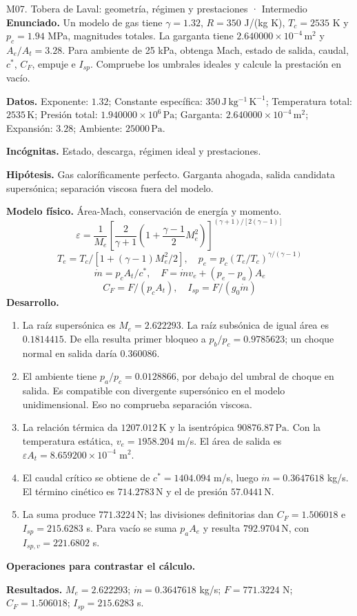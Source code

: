 \begin{studiumworked}{M07. Tobera de Laval: geometría, régimen y prestaciones · Intermedio}
\textbf{Enunciado.} Un modelo de gas tiene $\gamma=1.32$, $R=350$ J/(kg K), $T_c=2535$ K y $p_c=1.94$ MPa, magnitudes totales. La garganta tiene $2.640000\times10^{-4}\,\mathrm{m^2}$ y $A_e/A_t=3.28$. Para ambiente de 25 kPa, obtenga Mach, estado de salida, caudal, $c^*$, $C_F$, empuje e $I_{sp}$. Compruebe los umbrales ideales y calcule la prestación en vacío.

\textbf{Datos.} Exponente: $1.32$; Constante específica: $350\,\mathrm{J\,kg^{-1}\,K^{-1}}$; Temperatura total: $2535\,\mathrm{K}$; Presión total: $1.940000\times10^{6}\,\mathrm{Pa}$; Garganta: $2.640000\times10^{-4}\,\mathrm{m^2}$; Expansión: $3.28$; Ambiente: $25000\,\mathrm{Pa}$.

\textbf{Incógnitas.} Estado, descarga, régimen ideal y prestaciones.

\textbf{Hipótesis.} Gas caloríficamente perfecto. Garganta ahogada, salida candidata supersónica; separación viscosa fuera del modelo.

\textbf{Modelo físico.} Área-Mach, conservación de energía y momento.
\[\varepsilon=\frac1{M_e}\left[\frac2{\gamma+1}(1+\frac{\gamma-1}2M_e^2)\right]^{(\gamma+1)/[2(\gamma-1)]}\]
\[T_e=T_c/[1+(\gamma-1)M_e^2/2],\quad p_e=p_c(T_e/T_c)^{\gamma/(\gamma-1)}\]
\[\dot m=p_cA_t/c^*,\quad F=\dot m v_e+(p_e-p_a)A_e\]
\[C_F=F/(p_cA_t),\quad I_{sp}=F/(g_0\dot m)\]
\textbf{Desarrollo.}
\begin{enumerate}
\item La raíz supersónica es $M_e=2.622293$. La raíz subsónica de igual área es $0.1814415$. De ella resulta primer bloqueo a $p_b/p_c=0.9785623$; un choque normal en salida daría $0.360086$.
\item El ambiente tiene $p_a/p_c=0.0128866$, por debajo del umbral de choque en salida. Es compatible con divergente supersónico en el modelo unidimensional. Eso no comprueba separación viscosa.
\item La relación térmica da $1207.012\,\mathrm{K}$ y la isentrópica $90876.87\,\mathrm{Pa}$. Con la temperatura estática, $v_e=1958.204$ m/s. El área de salida es $\varepsilon A_t=8.659200\times10^{-4}$ m$^2$.
\item El caudal crítico se obtiene de $c^*=1404.094$ m/s, luego $\dot m=0.3647618$ kg/s. El término cinético es $714.2783\,\mathrm{N}$ y el de presión $57.0441\,\mathrm{N}$.
\item La suma produce $771.3224\,\mathrm{N}$; las divisiones definitorias dan $C_F=1.506018$ e $I_{sp}=215.6283$ s. Para vacío se suma $p_aA_e$ y resulta $792.9704\,\mathrm{N}$, con $I_{sp,v}=221.6802$ s.
\end{enumerate}
\textbf{Operaciones para contrastar el cálculo.}

\textbf{Resultados.} $M_e=2.622293$; $\dot m=0.3647618$ kg/s; $F=771.3224$ N; $C_F=1.506018$; $I_{sp}=215.6283$ s.


\end{studiumworked}
